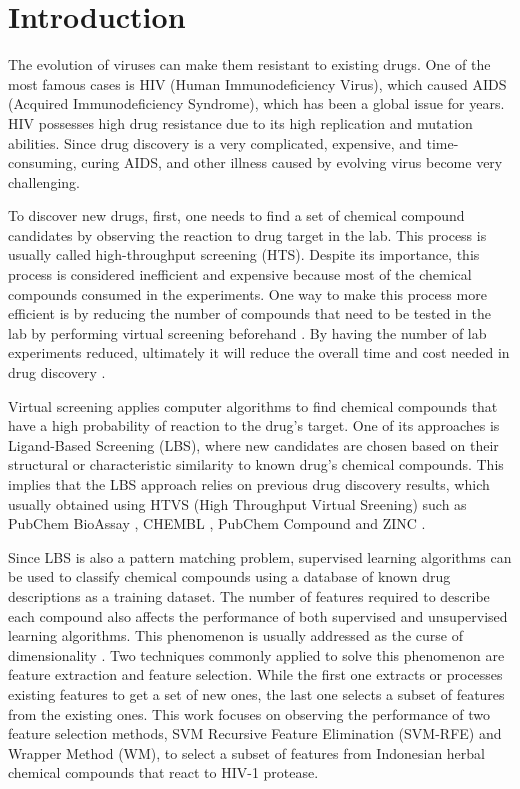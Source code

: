 \documentclass[conference]{IEEEtran}
\begin{document}
\IEEEpeerreviewmaketitle

\section{Introduction}

The evolution of viruses can make them resistant to existing drugs. One of the most famous cases is HIV (Human Immunodeficiency Virus), which caused AIDS (Acquired Immunodeficiency Syndrome), which has been a global issue for years. HIV possesses high drug resistance due to its high replication and mutation abilities. Since drug discovery is a very complicated, expensive, and time-consuming, curing AIDS, and other illness caused by evolving virus become very challenging\cite{yanuar2014virtual}.

To discover new drugs, first, one needs to find a set of chemical compound candidates by observing the reaction to drug target in the lab. This process is usually called high-throughput screening (HTS). Despite its importance, this process is considered inefficient and expensive because most of the chemical compounds consumed in the experiments. One way to make this process more efficient is by reducing the number of compounds that need to be tested in the lab by performing virtual screening beforehand \cite{chen2017developing}. By having the number of lab experiments reduced, ultimately it will reduce the overall time and cost needed in drug discovery \cite{korkmaz2014drug}.

Virtual screening applies computer algorithms to find chemical compounds that have a high probability of reaction to the drug's target. One of its approaches is Ligand-Based Screening (LBS), where new candidates are chosen based on their structural or characteristic similarity to known drug's chemical compounds. This implies that the LBS approach relies on previous drug discovery results, which usually obtained using HTVS (High Throughput Virtual Sreening) such as PubChem BioAssay \cite{bioassay2014update}, CHEMBL \cite{bento2014chembl}, PubChem Compound \cite{kim2015pubchem} and ZINC \cite{irwin2012zinc}.

Since LBS is also a pattern matching problem, supervised learning algorithms can be used to classify chemical compounds using a database of known drug descriptions as a training dataset. The number of features required to describe each compound also affects the performance of both supervised and unsupervised learning algorithms. This phenomenon is usually addressed as the curse of dimensionality \cite{janecek2008relationship}. Two techniques commonly applied to solve this phenomenon are feature extraction and feature selection. While the first one extracts or processes existing features to get a set of new ones, the last one selects a subset of features from the existing ones. This work focuses on observing the performance of two feature selection methods, SVM Recursive Feature Elimination (SVM-RFE) and Wrapper Method (WM), to select a subset of features from Indonesian herbal chemical compounds that react to HIV-1 protease.
\end{document}
